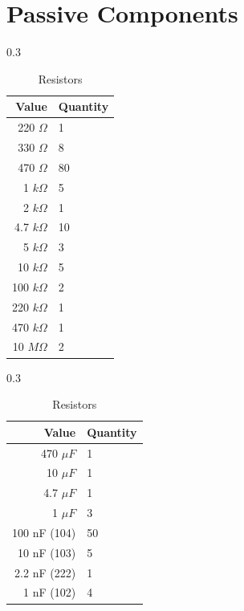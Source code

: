 \section{Passive Components}

\begin{table}[H]
  \centering
  \begin{subtable}[t]{0.3\textwidth}
    \vspace{0pt}
    \begin{tabular}{r|l}
      Value                    & Quantity \\ \hline
      220 $\Omega$              & 1  \\
      330 $\Omega$              & 8  \\
      470 $\Omega$              & 80 \\
      1 $k\Omega$               & 5  \\
      2 $k\Omega$               & 1  \\
      4.7 $k\Omega$             & 10 \\
      5 $k\Omega$               & 3  \\
      10 $k\Omega$              & 5  \\
      100 $k\Omega$             & 2  \\
      220 $k\Omega$             & 1  \\
      470 $k\Omega$             & 1  \\
      10 $M\Omega$              & 2  \\
    \end{tabular}
    \caption{Resistors}
  \end{subtable}
  \hfill
  \begin{subtable}[t]{0.3\textwidth}
    \vspace{0pt}
    \begin{tabular}{r|l}
      Value                    & Quantity \\ \hline
      470 $\mu F$              & 1 \\    
      10 $\mu F$               & 1 \\    
      4.7 $\mu F$              & 1 \\    
      1 $\mu F$                & 3 \\    
      100 nF (104)             & 50\\    
      10 nF (103)              & 5 \\    
      2.2 nF (222)             & 1 \\
      1 nF (102)               & 4 \\

\end{tabular}
\end{subtable}
\end{table}
